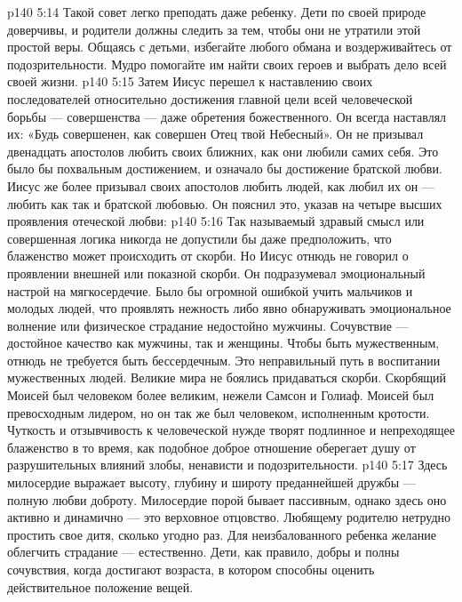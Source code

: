 \vs p140 5:14 Такой совет легко преподать даже ребенку. Дети по своей природе доверчивы, и родители должны следить за тем, чтобы они не утратили этой простой веры. Общаясь с детьми, избегайте любого обмана и воздерживайтесь от подозрительности. Мудро помогайте им найти своих героев и выбрать дело всей своей жизни.
\vs p140 5:15 \pc Затем Иисус перешел к наставлению своих последователей относительно достижения главной цели всей человеческой борьбы --- совершенства --- даже обретения божественного. Он всегда наставлял их: «Будь совершенен, как совершен Отец твой Небесный». Он не призывал двенадцать апостолов любить своих ближних, как они любили самих себя. Это было бы похвальным достижением, и означало бы достижение братской любви. Иисус же более призывал своих апостолов любить людей, как любил их он --- любить как  так и братской любовью. Он пояснил это, указав на четыре высших проявления отеческой любви:
\vs p140 5:16 \bibnobreakspace {} Так называемый здравый смысл или совершенная логика никогда не допустили бы даже предположить, что блаженство может происходить от скорби. Но Иисус отнюдь не говорил о проявлении внешней или показной скорби. Он подразумевал эмоциональный настрой на мягкосердечие. Было бы огромной ошибкой учить мальчиков и молодых людей, что проявлять нежность либо явно обнаруживать эмоциональное волнение или физическое страдание недостойно мужчины. Сочувствие --- достойное качество как мужчины, так и женщины. Чтобы быть мужественным, отнюдь не требуется быть бессердечным. Это неправильный путь в воспитании мужественных людей. Великие мира не боялись придаваться скорби. Скорбящий Моисей был человеком более великим, нежели Самсон и Голиаф. Моисей был превосходным лидером, но он так же был человеком, исполненным кротости. Чуткость и отзывчивость к человеческой нужде творят подлинное и непреходящее блаженство в то время, как подобное доброе отношение оберегает душу от разрушительных влияний злобы, ненависти и подозрительности.
\vs p140 5:17 \pc {}\bibnobreakspace {} Здесь милосердие выражает высоту, глубину и широту преданнейшей дружбы --- полную любви доброту. Милосердие порой бывает пассивным, однако здесь оно активно и динамично --- это верховное отцовство. Любящему родителю нетрудно простить свое дитя, сколько угодно раз. Для неизбалованного ребенка желание облегчить страдание --- естественно. Дети, как правило, добры и полны сочувствия, когда достигают возраста, в котором способны оценить действительное положение вещей.
